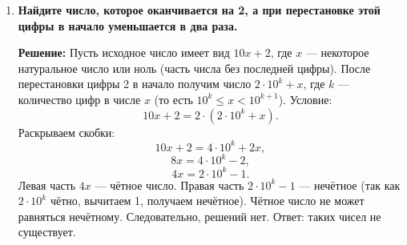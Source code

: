 \documentclass[12pt, a4paper]{article}
\begin{document}
\begin{enumerate}[label=\arabic*., wide=0pt, leftmargin=*]
\item \textbf{Найдите число, которое оканчивается на 2, а при перестановке этой цифры в начало уменьшается в два раза.}

\textbf{Решение:}
Пусть исходное число имеет вид \(10x + 2\), где \(x\) — некоторое натуральное число или ноль (часть числа без последней цифры). После перестановки цифры 2 в начало получим число \(2 \cdot 10^k + x\), где \(k\) — количество цифр в числе \(x\) (то есть \(10^k \le x < 10^{k+1}\)). Условие:
\[
10x + 2 = 2 \cdot (2 \cdot 10^k + x).
\]
Раскрываем скобки:
\[
10x + 2 = 4 \cdot 10^k + 2x,
\]
\[
8x = 4 \cdot 10^k - 2,
\]
\[
4x = 2 \cdot 10^k - 1.
\]
Левая часть \(4x\) — чётное число. Правая часть \(2 \cdot 10^k - 1\) — нечётное (так как \(2 \cdot 10^k\) чётно, вычитаем 1, получаем нечётное). Чётное число не может равняться нечётному. Следовательно, решений нет. 
Ответ: таких чисел не существует.

\end{enumerate}
\end{document}
